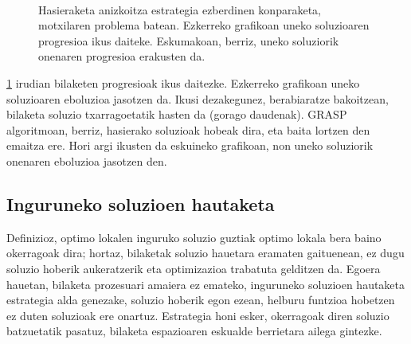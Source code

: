 \documentclass[eu]{ifirak}\usepackage[]{graphicx}\usepackage[]{color}
\begin{document}
\begin{figure}[t]
\qquad
{}\\

\caption{Hasieraketa anizkoitza estrategia ezberdinen konparaketa, motxilaren problema batean. Ezkerreko grafikoan uneko soluzioaren progresioa ikus daiteke. Eskumakoan, berriz, uneko soluziorik onenaren progresioa erakusten da.}\label{fig:GRASP}
\end{figure}

\ref{fig:GRASP} irudian bilaketen progresioak ikus daitezke. Ezkerreko grafikoan uneko soluzioaren eboluzioa jasotzen da. Ikusi dezakegunez, berabiaratze bakoitzean, bilaketa soluzio txarragoetatik hasten da (gorago daudenak). GRASP algoritmoan, berriz, hasierako soluzioak hobeak dira, eta baita lortzen den emaitza ere. Hori argi ikusten da eskuineko grafikoan, non uneko soluziorik onenaren eboluzioa jasotzen den.

\subsection{Inguruneko soluzioen hautaketa}

Definizioz, optimo lokalen inguruko soluzio guztiak optimo lokala bera baino okerragoak dira; hortaz, bilaketak soluzio hauetara eramaten gaituenean, ez dugu soluzio hoberik aukeratzerik eta optimizazioa trabatuta gelditzen da. Egoera hauetan, bilaketa prozesuari amaiera ez emateko, inguruneko soluzioen hautaketa estrategia alda genezake, soluzio hoberik egon ezean, helburu funtzioa hobetzen ez duten soluzioak ere onartuz. Estrategia honi esker, okerragoak diren soluzio batzuetatik pasatuz, bilaketa espazioaren eskualde berrietara ailega gintezke.
\end{document}
